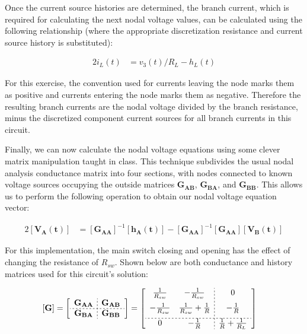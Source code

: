 \documentclass[10pt, oneside, letterpaper]{article}
\begin{document}
Once the current source histories are determined, the branch current, which is required for calculating the next nodal voltage values, can be calculated using the following relationship (where the appropriate discretization resistance and current source history is substituted):

\begin{alignat}{2}
i_{L}(t) &= v_{3}(t)/R_{L} - h_{L}(t)
\end{alignat}

For this exercise, the convention used for currents leaving the node marks them as positive and currents entering the node marks them as negative. Therefore the resulting branch currents are the nodal voltage divided by the branch resistance, minus the discretized component current sources for all branch currents in this circuit.

Finally, we can now calculate the nodal voltage equations using some clever matrix manipulation taught in class. This technique subdivides the usual nodal analysis conductance matrix into four sections, with nodes connected to known voltage sources occupying the outside matrices $\mathbf{G_{AB}}$, $\mathbf{G_{BA}}$, and $\mathbf{G_{BB}}$. This allows us to perform the following operation to obtain our nodal voltage equation vector:

\begin{alignat}{2}
\left[\mathbf{V_A(t)}\right] &= \left[\mathbf{G_{AA}}\right]^{-1}\left[\mathbf{h_A(t)}\right] - \left[\mathbf{G_{AA}}\right]^{-1}\left[\mathbf{G_{AA}}\right]\left[\mathbf{V_B(t)}\right]
\end{alignat}

For this implementation, the main switch closing and opening has the effect of changing the resistance of $R_{sw}$. Shown below are both conductance and history matrices used for this circuit's solution:

\begin{alignat}{2}
  \left[
  \mathbf{G}\right] &= \left[
      \begin{array}{c;{2pt/2pt}c}
        \mathbf{G_{AA}} & \mathbf{G_{AB}} \\ \hdashline[2pt/2pt]
        \mathbf{G_{BA}} & \mathbf{G_{BB}} 
      \end{array}
    \right] = \left[
      \begin{array}{cc;{2pt/2pt}c}
        \frac{1}{R_{sw}}    & -\frac{1}{R_{sw}}                 & 0                             \\ [6pt]
        -\frac{1}{R_{sw}}   & \frac{1}{R_{sw}} + \frac{1}{R}    & -\frac{1}{R}                  \\ [6pt] \hdashline[2pt/2pt]
        0                   & -\frac{1}{R}                      & \frac{1}{R} + \frac{1}{R_L}
      \end{array}
  \right]
\end{alignat}
\end{document}
